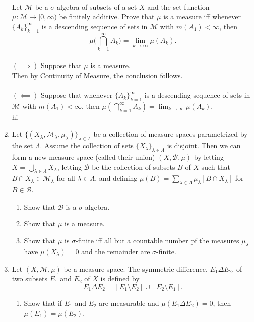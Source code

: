 \begin{enumerate}
	\\Let $\mathcal{M}$ be a $\sigma$-algebra of subsets of a set $X$ and the set function $\mu : \mathcal{M} \to [0,\infty)$ be finitely additive.
	Prove that $\mu$ is a measure iff whenever $\{A_k\}_{k=1}^\infty$ is a descending sequence of sets in $\mathcal{M}$ with $m(A_1)<\infty$, then
	\[
	\mu \biggl ( \bigcap_{k=1}^\infty A_k \biggr ) = \lim_{k \to \infty} \mu(A_k).	
	\]
	\\$(\implies)$ Suppose that $\mu$ is a measure.\\
	Then by Continuity of Measure, the conclusion follows.\\
	\\$(\impliedby)$ Suppose that whenever $\{A_k\}_{k=1}^\infty$ is a descending sequence of sets in $\mathcal{M}$ with $m(A_1)<\infty$, then $\mu ( \bigcap_{k=1}^\infty A_k ) = \lim_{k \to \infty} \mu(A_k)$.\\
	hi
	\item Let $\{(X_\lambda,\mathcal{M}_\lambda,\mu_\lambda)\}_{\lambda\in\Lambda}$ be a collection of measure spaces parametrized by the set $\Lambda$.
	Assume the collection of sets $\{X_\lambda\}_{\lambda\in\Lambda}$ is disjoint.
	Then we can form a new measure space (called their union) $(X,\mathcal{B},\mu)$ by letting $X=\bigcup_{\lambda\in\Lambda}X_\lambda$, letting $\mathcal{B}$ be the collection of subsets $B$ of $X$ such that $B\cap X_\lambda\in\mathcal{M}_\lambda$ for all $\lambda\in\Lambda$, and defining $\mu(B)=\sum_{\lambda\in\Lambda}\mu_\lambda[B\cap X_\lambda]$ for $B\in\mathcal{B}$.
	\begin{enumerate}[label=(\roman*),align=left]   
		\item Show that $\mathcal{B}$ is a $\sigma$-algebra.
		\item Show that $\mu$ is a measure.
		\item Show that $\mu$ is $\sigma$-finite iff all but a countable number pf the measures $\mu_\lambda$ have $\mu(X_\lambda)=0$ and the remainder are $\sigma$-finite. 
	\end{enumerate}
	\item Let $(X,\mathcal{M},\mu)$ be a measure space. The symmetric difference, $E_1\Delta E_2$, of two subsets $E_1$ and $E_2$ of $X$ is defined by
	\[
		E_1\Delta E_2=[E_1\setminus E_2]\cup[E_2\setminus E_1].
	\]
	\begin{enumerate}[label=(\roman*),align=left]   
		\item Show that if $E_1$ and $E_2$ are measurable and $\mu(E_1\Delta E_2)=0$, then $\mu(E_1)=\mu(E_2)$.\\

\end{enumerate}
\end{enumerate}
